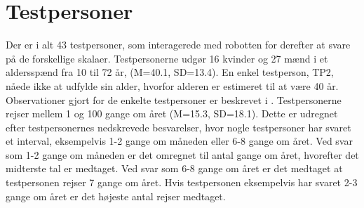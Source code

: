 \section{Testpersoner}
\label{ParametreFaktiskeTestpersoner}
%
Der er i alt 43 testpersoner, som interagerede med robotten for derefter at svare på de forskellige skalaer. Testpersonerne udgør 16 kvinder og 27 mænd i et aldersspænd fra 10 til 72 år, (M=40.1, SD=13.4). En enkel testperson, TP2, nåede ikke at udfylde sin alder, hvorfor alderen er estimeret til at være 40 år. Observationer gjort for de enkelte testpersoner er beskrevet i . Testpersonerne rejser mellem 1 og 100 gange om året (M=15.3, SD=18.1). Dette er udregnet efter testpersonernes nedskrevede besvarelser, hvor nogle testpersoner har svaret et interval, eksempelvis 1-2 gange om måneden eller 6-8 gange om året. Ved svar som 1-2 gange om måneden er det omregnet til antal gange om året, hvorefter det midterste tal er medtaget. Ved svar som 6-8 gange om året er det medtaget at testpersonen rejser 7 gange om året. Hvis testpersonen eksempelvis har svaret 2-3 gange om året er det højeste antal rejser medtaget.
%

